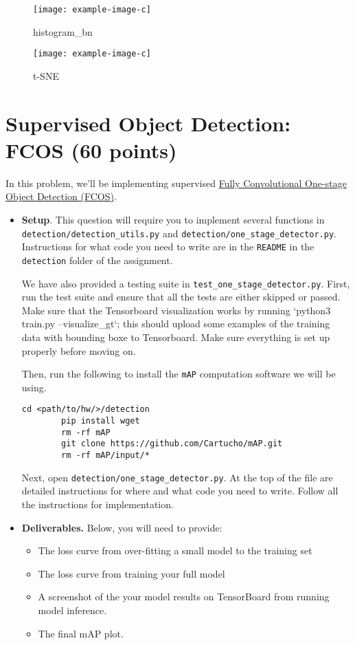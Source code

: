 \documentclass[11pt,addpoints,answers]{exam}
\numberwithin{equation}{section} %
\numberwithin{figure}{section} %
\numberwithin{table}{section} %
\begin{document}
\begin{itemize}
\begin{figure}[H]
\centering
\texttt{[image: example-image-c]}
\caption{histogram\_bn}
\label{fig:q2_bn}
\end{figure}

\begin{figure}[H]
\centering
\texttt{[image: example-image-c]}
\caption{t-SNE}
\label{fig:q2_tsne}
\end{figure}

\end{itemize}

\clearpage
\section{Supervised Object Detection: FCOS (60 points)}
In this problem, we'll be implementing supervised {\href{https://arxiv.org/abs/1904.01355}{Fully Convolutional One-stage Object Detection (FCOS)}}. 

\begin{itemize}
    \item \textbf{Setup}. This question will require you to implement several functions in \texttt{detection/detection\_utils.py} and \texttt{detection/one\_stage\_detector.py}. Instructions for what code you need to write are in the \texttt{README} in the \texttt{detection} folder of the assignment.
    
    We have also provided a testing suite in \texttt{test\_one\_stage\_detector.py}. First, run the test suite
    and ensure that all the tests are either skipped or passed. Make sure that the Tensorboard visualization works by running `python3 train.py --visualize\_gt`; this should upload some examples of the training data with bounding boxe to Tensorboard. Make sure everything is set up properly before moving on.

    Then, run the following to install the \texttt{mAP} computation software we will be using.
    \begin{lstlisting}[language=Shell]
        cd <path/to/hw/>/detection
        pip install wget  
        rm -rf mAP
        git clone https://github.com/Cartucho/mAP.git
        rm -rf mAP/input/*
    \end{lstlisting}

    Next, open \texttt{detection/one\_stage\_detector.py}. At the top of the file are detailed
    instructions for where and what code you need to write. Follow all the instructions for implementation. 

    \item \textbf{Deliverables.} Below, you will need to provide:
    \begin{itemize}
        \item The loss curve from over-fitting a small model to the training set
        \item The loss curve from training your full model
        \item A screenshot of the your model results on TensorBoard from running model inference.
        \item The final mAP plot.
    \end{itemize}
\end{itemize}
\end{document}

